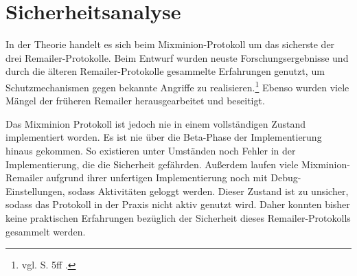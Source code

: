 \section{Sicherheitsanalyse}
In der Theorie handelt es sich beim Mixminion-Protokoll um das sicherste der drei Remailer-Protokolle. Beim Entwurf wurden neuste Forschungsergebnisse und durch die älteren Remailer-Protokolle gesammelte Erfahrungen genutzt, um Schutzmechanismen gegen bekannte Angriffe zu realisieren.\footnote{vgl. S. 5ff \cite{mixminion}.} Ebenso wurden viele Mängel der früheren Remailer herausgearbeitet und beseitigt. 

Das Mixminion Protokoll ist jedoch nie in einem vollständigen Zustand implementiert worden. Es ist nie über die Beta-Phase der Implementierung hinaus gekommen. So existieren unter Umständen noch Fehler in der Implementierung, die die Sicherheit gefährden. Außerdem laufen viele Mixminion-Remailer aufgrund ihrer unfertigen Implementierung noch mit Debug-Einstellungen, sodass Aktivitäten geloggt werden. Dieser Zustand ist zu unsicher, sodass das Protokoll in der Praxis nicht aktiv genutzt wird. Daher konnten bisher keine praktischen Erfahrungen bezüglich der Sicherheit dieses Remailer-Protokolls gesammelt werden.



